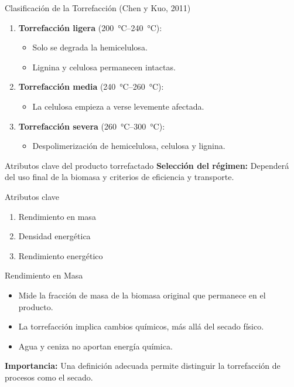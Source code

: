 \documentclass[main.tex]{subfiles}
\begin{document}
\begin{frame}{Clasificación de la Torrefacción (Chen y Kuo, 2011)}
\begin{enumerate}
  \item \textbf{Torrefacción ligera} (\SIrange{200}{240}{\celsius}):
  \begin{itemize}
    \item Solo se degrada la hemicelulosa.
    \item Lignina y celulosa permanecen intactas.
  \end{itemize}
  \item \textbf{Torrefacción media} (\SIrange{240}{260}{\celsius}):
  \begin{itemize}
    \item La celulosa empieza a verse levemente afectada.
  \end{itemize}
  \item \textbf{Torrefacción severa} (\SIrange{260}{300}{\celsius}):
  \begin{itemize}
    \item Despolimerización de hemicelulosa, celulosa y lignina.
  \end{itemize}
\end{enumerate}
\end{frame}

\begin{frame}{Atributos clave del producto torrefactado}
\textbf{Selección del régimen:} Dependerá del uso final de la biomasa y criterios de eficiencia y transporte.
\begin{alertblock}{Atributos clave}
\begin{enumerate}
  \item Rendimiento en masa
  \item Densidad energética
  \item Rendimiento energético
\end{enumerate}
\end{alertblock}
\end{frame}

\begin{frame}{Rendimiento en Masa}
\begin{itemize}
  \item Mide la fracción de masa de la biomasa original que permanece en el producto.
  \item La torrefacción implica cambios químicos, más allá del secado físico.
  \item Agua y ceniza no aportan energía química.
\end{itemize}
\vspace{0.5em}
\textbf{Importancia:} Una definición adecuada permite distinguir la torrefacción de procesos como el secado.
\end{frame}
\end{document}
